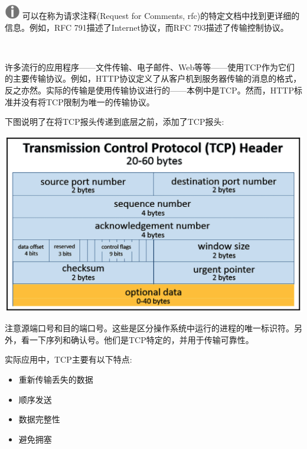 \hspace*{\fill} \\ %
\includegraphics[width=0.05\textwidth]{images/warn}
可以在称为请求注释(Request for Comments, rfc)的特定文档中找到更详细的信息。例如，RFC 791描述了Internet协议，而RFC 793描述了传输控制协议。 \par
\noindent\textbf{}\ \par

许多流行的应用程序——文件传输、电子邮件、Web等等——使用TCP作为它们的主要传输协议。例如，HTTP协议定义了从客户机到服务器传输的消息的格式，反之亦然。实际的传输是使用传输协议进行的——本例中是TCP。然而，HTTP标准并没有将TCP限制为唯一的传输协议。 \par
下图说明了在将TCP报头传递到底层之前，添加了TCP报头: \par

\begin{center}
	\includegraphics[width=1.0\textwidth]{content/Section-2/Chapter-12/7}
\end{center}

注意源端口号和目的端口号。这些是区分操作系统中运行的进程的唯一标识符。另外，看一下序列和确认号。他们是TCP特定的，并用于传输可靠性。 \par
实际应用中，TCP主要有以下特点: \par

\begin{itemize}
	\item 重新传输丢失的数据
	\item 顺序发送
	\item 数据完整性
	\item 避免拥塞
\end{itemize}

